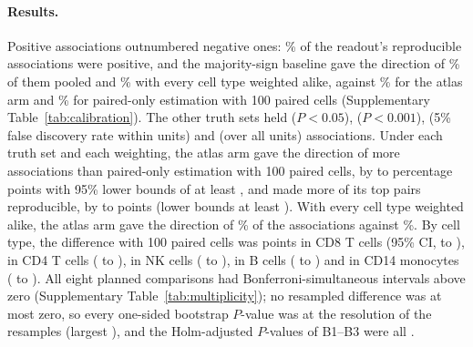 \paragraph{Results.} Positive associations outnumbered negative ones: \CbPosPrimary\% of the readout's reproducible associations were positive, and the majority-sign baseline gave the direction of \CbMajPrimaryPooled\% of them pooled and \CbMajPrimaryType\% with every cell type weighted alike, against \BoOneAtlasHundred\% for the atlas arm and \BoOnePoHundred\% for paired-only estimation with 100 paired cells (Supplementary Table~\ref{tab:calibration}). The other truth sets held \CbNTwentieth{} ($P<0.05$), \CbNThousandth{} ($P<0.001$), \CbNFdrUnit{} (5\% false discovery rate within units) and \CbNFdrAll{} (over all units) associations. Under each truth set and each weighting, the atlas arm gave the direction of more associations than paired-only estimation with 100 paired cells, by \CbDiffOneMin{} to \CbDiffOneMax{} percentage points with 95\% lower bounds of at least \CbDiffOneLoMin, and made more of its top pairs reproducible, by \CbDiffTwoMin{} to \CbDiffTwoMax{} points (lower bounds at least \CbDiffTwoLoMin). With every cell type weighted alike, the atlas arm gave the direction of \CbOnePrimaryTypeAtlasHundred\% of the associations against \CbOnePrimaryTypePoHundred\%. By cell type, the difference with 100 paired cells was \CbTypeOneCDEightDiffHundred{} points in CD8 T cells (95\% CI, \CbTypeOneCDEightDiffHundredLo{} to \CbTypeOneCDEightDiffHundredHi), \CbTypeOneCDFourDiffHundred{} in CD4 T cells (\CbTypeOneCDFourDiffHundredLo{} to \CbTypeOneCDFourDiffHundredHi), \CbTypeOneNKDiffHundred{} in NK cells (\CbTypeOneNKDiffHundredLo{} to \CbTypeOneNKDiffHundredHi), \CbTypeOneBDiffHundred{} in B cells (\CbTypeOneBDiffHundredLo{} to \CbTypeOneBDiffHundredHi) and \CbTypeOneMonoDiffHundred{} in CD14 monocytes (\CbTypeOneMonoDiffHundredLo{} to \CbTypeOneMonoDiffHundredHi). All eight planned comparisons had Bonferroni-simultaneous intervals above zero (Supplementary Table~\ref{tab:multiplicity}); no resampled difference was at most zero, so every one-sided bootstrap $P$-value was at the resolution of the resamples (largest \CbPlanMaxP), and the Holm-adjusted $P$-values of B1--B3 were all \CbHolmMax.

